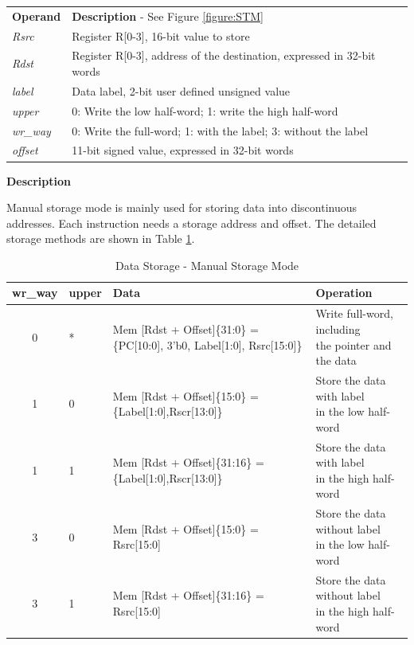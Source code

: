 \documentclass[main\_\_EN.tex]{subfiles}
\begin{document}
\begin{tabular}{ l l }
\textbf{Operand} & \textbf{Description} - See Figure \ref{figure:STM} \\
\textit{Rsrc} & Register R[0-3], 16-bit value to store\\
\textit{Rdst} & Register R[0-3], address of the destination, expressed in 32-bit words\\
\textit{label} & Data label, 2-bit user defined unsigned value\\
\textit{upper} & 0: Write the low half-word; 1: write the high half-word\\
\textit{wr\_way} & 0: Write the full-word; 1: with the label; 3: without the label\\
\textit{offset} & 11-bit signed value, expressed in 32-bit words
\end{tabular}

\textbf{Description}

Manual storage mode is mainly used for storing data into discontinuous addresses. Each instruction needs a storage address and offset. The detailed storage methods are shown in Table  \ref{table:data_format-with-write_way}. \\

\begin{table}[!ht ]
    \centering
    \begin{tabular}{ c l l l }
    \textbf{wr\_way}  & \textbf{upper} & \textbf{Data} & \textbf{Operation}  \\ \hline
    0 &*&Mem [Rdst + Offset]\{31:0\} =\{PC[10:0], 3'b0, Label[1:0], Rsrc[15:0]\}  & \makecell[tl]{Write full-word, including  \\ the pointer and the data} \\
    1 & 0 & Mem [Rdst + Offset]\{15:0\} =  \{Label[1:0],Rscr[13:0]\}& \makecell[tl]{Store the data with label  \\ in the low half-word}\\
    1 & 1 & Mem [Rdst + Offset]\{31:16\} = \{Label[1:0],Rscr[13:0]\} & \makecell[tl]{Store the data with label  \\ in the high half-word}\\
    3 & 0 & Mem [Rdst + Offset]\{15:0\} = Rsrc[15:0]& \makecell[tl]{Store the data without label  \\ in the low half-word}  \\
    3 & 1 & Mem [Rdst + Offset]\{31:16\} = Rsrc[15:0]& \makecell[tl]{Store the data without label  \\ in the high half-word}  \\
    \end{tabular}
    \caption{Data Storage - Manual Storage Mode}
    \label{table:data_format-with-write_way}
\end{table}
\end{document}
